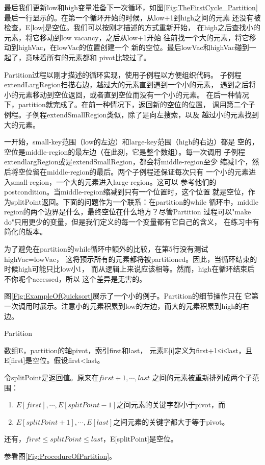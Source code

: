 最后我们更新low和high变量准备下一次循环，如图\ref{Fig:TheFirstCycle_Partition}
最后一行显示的。在第一个循环开始的时候，从low+1到high之间的元素
还没有被检查，E[low]是空位。我们可以按刚才描述的方式重新开始，
在high之后查找小的元素，将它移动到low vacancy，之后从low+1开始
往前找一个大的元素，将它移动到highVac，在lowVac的位置创建一个
新的空位。最后lowVac和highVac碰到一起了，意味着所有的元素都和
pivot比较过了。

Partition过程以刚才描述的循环实现，使用子例程以方便组织代码。
子例程extendLargRegion扫描右边，越过大的元素直到遇到一个小的元素，
遇到之后将小的元素移动到空位返回，或者直到空位而没有一个小的元素。
在后一种情况下，partition就完成了。在前一种情况下，返回新的空位的位置，
调用第二个子例程。子例程extendSmallRegion类似，除了是向左搜索，以及
越过小的元素找到大的元素。

一开始，small-key范围（low的左边）和large-key范围（high的右边）都是
空的，空位是middle-region的最左边（在此刻，它是整个数组）。每一次调用
子例程extendlargRegion或是extendSmallRegion，都会将middle-region至少
缩减1个，然后将空位留在middle-region的最后。两个子例程还保证每次只有
一个小的元素进入small-region，一个大的元素进入large-region。这可以
参考他们的postcondition。当middle-region缩减到只有一个位置时，这个位置
就是空位，作为splitPoint返回。下面的问题作为一个联系：在partition的while
循环中，middle region的两个边界是什么，最终空位在什么地方？尽管Partition
过程可以"make do"只用更少的变量，但是我们定义的每一个变量都有它自己的含义，
在练习中有简化的版本。

为了避免在partition的while循环中额外的比较，在第5行没有测试highVac=lowVac，
这将预示所有的元素都将被partitioned。因此，当循环结束的时候high可能只比low小1，
而从逻辑上来说应该相等。然而，high在循环结束后不你呢个accessed，所以
这个差异是无害的。

图\ref{Fig:ExampleOfQuicksort}展示了一个小的例子。Partition的细节操作只在
它第一次调用时展示。注意小的元素积累到low的左边，而大的元素积累到high的右边。

\begin{algorithm}\label{Algo:Partition}
Partition

数组E，partition的轴pivot，索引first和last，
元素E[i]定义为first+1≤i≤last，且E[first]是空位。假设first<last。

令splitPoint是返回值。原来在$first+1, \cdots, last$
之间的元素被重新排列成两个子范围：
\begin{enumerate}
\item $E[first], \cdots, E[splitPoint-1]$之间元素的关键字都小于pivot，而
\item $E[splitPoint+1], \cdots, E[last]$之间元素的关键字都大于等于pivot。
\end{enumerate}
还有，$first\leq splitPoint \leq last$，E[splitPoint]是空位。

参看图\ref{Fig:ProcedureOfPartition}。

\end{algorithm}

